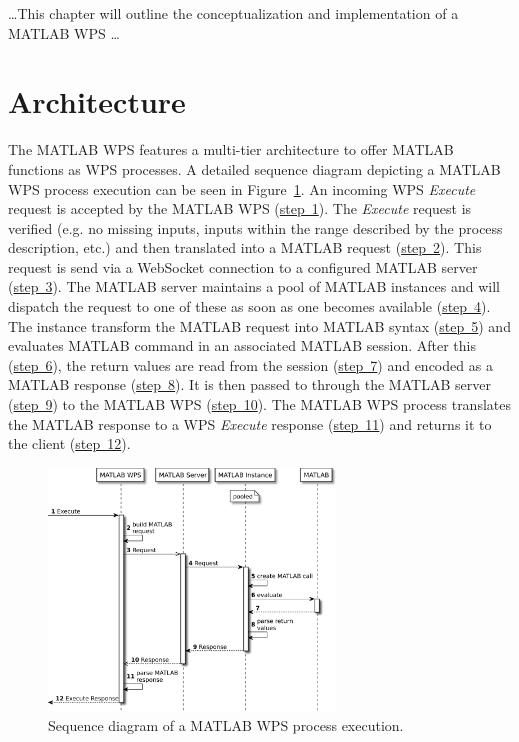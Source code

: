 	

  	\dots This chapter will outline the conceptualization and implementation of a MATLAB WPS \dots

	\section{Architecture}
		The MATLAB WPS features a multi-tier architecture to offer MATLAB functions as \acl{WPS} processes. A detailed sequence diagram depicting a MATLAB WPS process execution can be seen in Figure~\ref{fig:sd:mwps}. An incoming WPS \emph{Execute} request is accepted by the MATLAB WPS (\hyperref[fig:sd:mwps]{step~1}). The \emph{Execute} request is verified (e.g. no missing inputs, inputs within the range described by the process description, etc.) and then translated into a MATLAB request (\hyperref[fig:sd:mwps]{step~2}). This request is send via a WebSocket connection to a configured MATLAB server (\hyperref[fig:sd:mwps]{step~3}). The MATLAB server maintains a pool of MATLAB instances and will dispatch the request to one of these as soon as one becomes available (\hyperref[fig:sd:mwps]{step~4}). The instance transform the MATLAB request into MATLAB syntax (\hyperref[fig:sd:mwps]{step~5}) and evaluates MATLAB command in an associated MATLAB session. After this (\hyperref[fig:sd:mwps]{step~6}), the return values are read from the session (\hyperref[fig:sd:mwps]{step~7}) and encoded as a MATLAB response (\hyperref[fig:sd:mwps]{step~8}). It is then passed to through the MATLAB server (\hyperref[fig:sd:mwps]{step~9}) to the MATLAB WPS (\hyperref[fig:sd:mwps]{step~10}). The MATLAB WPS process translates the MATLAB response to a WPS \emph{Execute} response (\hyperref[fig:sd:mwps]{step~11}) and returns it to the client (\hyperref[fig:sd:mwps]{step~12}).

		\begin{figure}[!htb]
			\centering
			\includegraphics[width=0.6788732394366197\textwidth]{figures/sequence-diagramm-mwps.pdf}
			\caption{\label{fig:sd:mwps}Sequence diagram of a MATLAB WPS process execution.}
		\end{figure}

